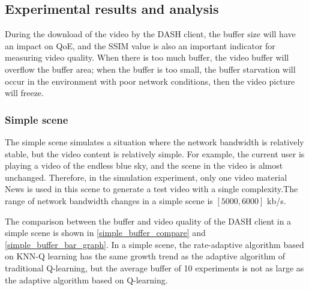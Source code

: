 \documentclass[twocolumn]{article}
\begin{document}
\subsection{Experimental results and analysis}
During the download of the video by the DASH client, the buffer size 
will have an impact on QoE, and the SSIM value is also an important indicator 
for measuring video quality. When there is too much buffer, the video buffer 
will overflow the buffer area; when the buffer is too small, the buffer starvation 
will occur in the environment with poor network conditions, then the video picture will freeze.
\subsubsection{Simple scene}
The simple scene simulates a situation where the network bandwidth is relatively stable, 
but the video content is relatively simple. For example, the current user is playing a video 
of the endless blue sky, and the scene in the video is almost unchanged. Therefore, 
in the simulation experiment, only one video material News is used in this scene to 
generate a test video with a single complexity.The range of network bandwidth changes 
in a simple scene is $\left[5000,6000\right]$ kb/s.

The comparison between the buffer and video quality of the DASH client in a simple scene 
is shown in \ref{simple_buffer_compare} and \ref{simple_buffer_bar_graph}.
In a simple scene, the rate-adaptive algorithm based on KNN-Q learning has the same 
growth trend as the adaptive algorithm of traditional Q-learning, but the average 
buffer of 10 experiments is not as large as the adaptive algorithm based on Q-learning.
\end{document}
